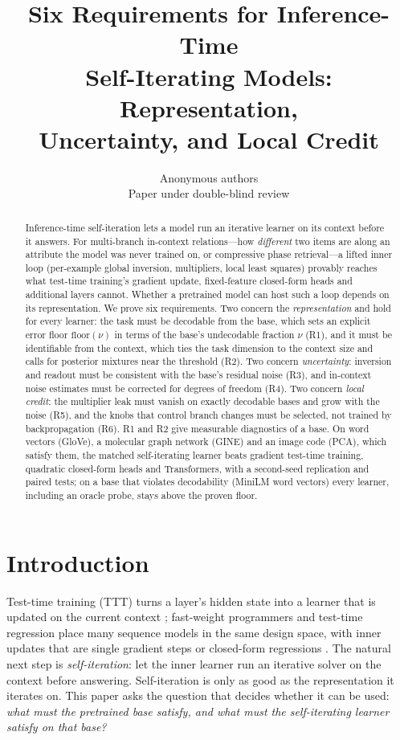 \documentclass{article}
\title{Six Requirements for Inference-Time\\Self-Iterating Models: Representation,\\Uncertainty, and Local Credit}
\author{Anonymous authors\\
Paper under double-blind review}
\theoremstyle{definition}
\theoremstyle{remark}
\newcommand{\flr}{\mathrm{floor}}
\begin{document}
\maketitle

\begin{abstract}
Inference-time self-iteration lets a model run an iterative learner on its context before it answers.
For multi-branch in-context relations---how \emph{different} two items are along an attribute the model was never trained on, or compressive phase retrieval---a lifted inner loop (per-example global inversion, multipliers, local least squares) provably reaches what test-time training's gradient update, fixed-feature closed-form heads and additional layers cannot.
Whether a pretrained model can host such a loop depends on its representation.
We prove six requirements.
Two concern the \emph{representation} and hold for every learner: the task must be decodable from the base, which sets an explicit error floor $\flr(\nu)$ in terms of the base's undecodable fraction $\nu$ (R1), and it must be identifiable from the context, which ties the task dimension to the context size and calls for posterior mixtures near the threshold (R2).
Two concern \emph{uncertainty}: inversion and readout must be consistent with the base's residual noise (R3), and in-context noise estimates must be corrected for degrees of freedom (R4).
Two concern \emph{local credit}: the multiplier leak must vanish on exactly decodable bases and grow with the noise (R5), and the knobs that control branch changes must be selected, not trained by backpropagation (R6).
R1 and R2 give measurable diagnostics of a base.
On word vectors (GloVe), a molecular graph network (GINE) and an image code (PCA), which satisfy them, the matched self-iterating learner beats gradient test-time training, quadratic closed-form heads and Transformers, with a second-seed replication and paired tests; on a base that violates decodability (MiniLM word vectors) every learner, including an oracle probe, stays above the proven floor.
\end{abstract}

\section{Introduction}

Test-time training (TTT) turns a layer's hidden state into a learner that is updated on the current context \citep{sun2023ttt,sun2024ttt}; fast-weight programmers and test-time regression place many sequence models in the same design space, with inner updates that are single gradient steps or closed-form regressions \citep{schlag2021fastweights,wang2026ttr}.
The natural next step is \emph{self-iteration}: let the inner learner run an iterative solver on the context before answering.
Self-iteration is only as good as the representation it iterates on.
This paper asks the question that decides whether it can be used: \emph{what must the pretrained base satisfy, and what must the self-iterating learner satisfy on that base?}
\end{document}
